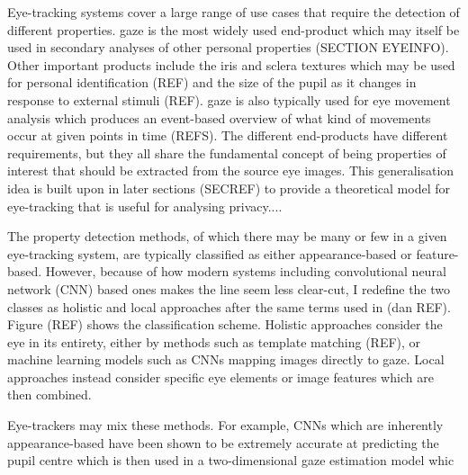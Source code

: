 Eye-tracking systems cover a large range of use cases that require the detection of different properties. \Gls{gaze} is the most widely used end-product which may itself be used in secondary analyses of other personal properties (SECTION EYEINFO). Other important products include the iris and sclera textures which may be used for personal identification (REF) and the size of the pupil as it changes in response to external stimuli (REF). \Gls{gaze} is also typically used for eye movement analysis which produces an event-based overview of what kind of movements occur at given points in time (REFS). The different end-products have different requirements, but they all share the fundamental concept of being properties of interest that should be extracted from the source eye images. This generalisation idea is built upon in later sections (SECREF) to provide a theoretical model for eye-tracking that is useful for analysing privacy....

The property detection methods, of which there may be many or few in a given eye-tracking system, are typically classified as either appearance-based or feature-based. However, because of how modern systems including convolutional neural network (CNN) based ones makes the line seem less clear-cut, I redefine the two classes as holistic and local approaches after the same terms used in (dan REF). Figure (REF) shows the classification scheme. Holistic approaches consider the eye in its entirety, either by methods such as template matching (REF), or machine learning models such as CNNs mapping images directly to gaze. Local approaches instead consider specific eye elements or image features which are then combined. 

Eye-trackers may mix these methods. For example, CNNs which are inherently appearance-based have been shown to be extremely accurate at predicting the pupil centre which is then used in a two-dimensional gaze estimation model whic






